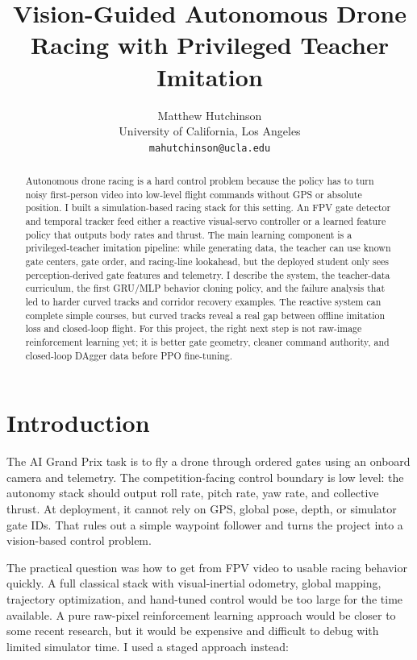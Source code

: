 \documentclass[11pt]{article}
\title{Vision-Guided Autonomous Drone Racing with Privileged Teacher Imitation}
\author{
  Matthew Hutchinson \\
  University of California, Los Angeles \\
  \texttt{mahutchinson@ucla.edu}
}
\begin{document}
\maketitle

\begin{abstract}
Autonomous drone racing is a hard control problem because the policy has to turn noisy first-person video into low-level flight commands without GPS or absolute position. I built a simulation-based racing stack for this setting. An FPV gate detector and temporal tracker feed either a reactive visual-servo controller or a learned feature policy that outputs body rates and thrust. The main learning component is a privileged-teacher imitation pipeline: while generating data, the teacher can use known gate centers, gate order, and racing-line lookahead, but the deployed student only sees perception-derived gate features and telemetry. I describe the system, the teacher-data curriculum, the first GRU/MLP behavior cloning policy, and the failure analysis that led to harder curved tracks and corridor recovery examples. The reactive system can complete simple courses, but curved tracks reveal a real gap between offline imitation loss and closed-loop flight. For this project, the right next step is not raw-image reinforcement learning yet; it is better gate geometry, cleaner command authority, and closed-loop DAgger data before PPO fine-tuning.
\end{abstract}

\section{Introduction}

The AI Grand Prix task is to fly a drone through ordered gates using an onboard camera and telemetry. The competition-facing control boundary is low level: the autonomy stack should output roll rate, pitch rate, yaw rate, and collective thrust. At deployment, it cannot rely on GPS, global pose, depth, or simulator gate IDs. That rules out a simple waypoint follower and turns the project into a vision-based control problem.

The practical question was how to get from FPV video to usable racing behavior quickly. A full classical stack with visual-inertial odometry, global mapping, trajectory optimization, and hand-tuned control would be too large for the time available. A pure raw-pixel reinforcement learning approach would be closer to some recent research, but it would be expensive and difficult to debug with limited simulator time. I used a staged approach instead:
\end{document}

